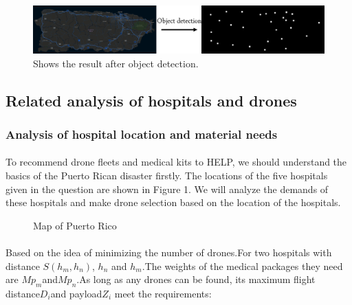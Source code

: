 \documentclass{article} %
\begin{document}
    \begin{figure}[h]
        \centering
            \includegraphics[scale=0.6]{object_detection.png}
        \caption{Shows the result after object detection.}
    \end{figure}

    \subsection{Related analysis of hospitals and drones}
\subsubsection{Analysis of hospital location and material needs}
\paragraph{}To recommend drone fleets and medical kits to HELP, we should understand the basics of the Puerto Rican disaster firstly. The locations of the five hospitals given in the question are shown in Figure 1. We will analyze the demands of these hospitals and make drone selection based on the location of the hospitals.
\begin{figure}[htb] 
 \caption{\label{1}Map of Puerto Rico} 
 \end{figure}
\paragraph{}Based on the idea of minimizing the number of drones.For two hospitals with distance $S\left(h_{m}, h_{n}\right)$, $h_{n}$ and $h_{m}$.The weights of the medical packages they need are $M p_{m}$and$M p_{n}$.As long as any drones can be found, its maximum flight distance$D_{i}$and payload$Z_{i}$ meet the requirements:
\end{document}
